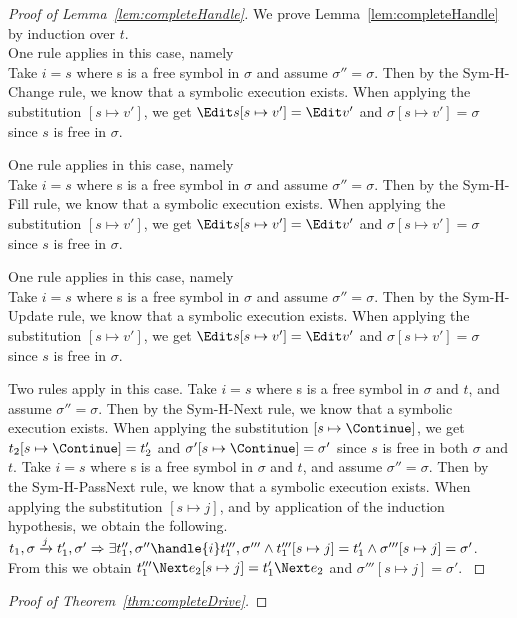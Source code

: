 \begin{proof}[Proof of Lemma~\ref{lem:completeHandle}]

  We prove Lemma~\ref{lem:completeHandle} by induction over $t$.\\

  {One rule applies in this case, namely \\
  Take $i=s$ where s is a free symbol in $\sigma$ and assume $\sigma''=\sigma$.
  Then by the Sym-H-Change rule,
  we know that a symbolic execution exists.
  When applying the substitution $[s\mapsto v']$,
  we get $\Edit s[s\mapsto v'] = \Edit v'$ and $\sigma[s\mapsto v']=\sigma$ since $s$ is free in $\sigma$.
  }

  {One rule applies in this case, namely \\
  Take $i=s$ where s is a free symbol in $\sigma$ and assume $\sigma''=\sigma$.
  Then by the Sym-H-Fill rule,
  we know that a symbolic execution exists.
  When applying the substitution $[s\mapsto v']$,
  we get $\Edit s[s\mapsto v'] = \Edit v'$ and $\sigma[s\mapsto v']=\sigma$ since $s$ is free in $\sigma$. }

  {One rule applies in this case, namely \\
  Take $i=s$ where s is a free symbol in $\sigma$ and assume $\sigma''=\sigma$.
  Then by the Sym-H-Update rule,
  we know that a symbolic execution exists.
  When applying the substitution $[s\mapsto v']$,
  we get $\Edit s[s\mapsto v'] = \Edit v'$ and $\sigma[s\mapsto v']=\sigma$ since $s$ is free in $\sigma$. }

  {Two rules apply in this case.
    {
    Take $i=s$ where s is a free symbol in $\sigma$ and $t$, and assume $\sigma''=\sigma$.
    Then by the Sym-H-Next rule,
    we know that a symbolic execution exists.
    When applying the substitution $[s\mapsto \Continue]$,
    we get $t_2[s\mapsto \Continue] = t_2'$ and $\sigma'[s\mapsto \Continue]=\sigma'$ since $s$ is free in both $\sigma$ and $t$.
    }
    {
    Take $i=s$ where s is a free symbol in $\sigma$ and $t$, and assume $\sigma''=\sigma$.
    Then by the Sym-H-PassNext rule,
    we know that a symbolic execution exists.
    When applying the substitution $[s\mapsto j]$, and by application of the induction hypothesis, we obtain the following.\\
    $t_1,\sigma\xrightarrow[]{j}t_1',\sigma'\implies \exists t_1'',\sigma''\handle{i}t_1''',\sigma'''\land t_1'''[s\mapsto j] = t_1'\land \sigma'''[s\mapsto j]=\sigma'$.\\
    From this we obtain $t_1'''\Next e_2[s\mapsto j] = t_1'\Next e_2$ and $\sigma'''[s\mapsto j]=\sigma'$.
    }
  }



\end{proof}



\begin{proof}[Proof of Theorem~\ref{thm:completeDrive}]
\end{proof}

